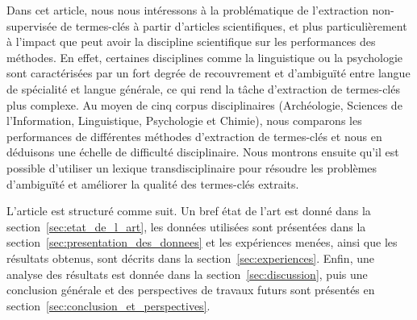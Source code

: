   Dans cet article, nous nous intéressons à la problématique de l'extraction non-supervisée de termes-clés à partir d'articles scientifiques, et plus particulièrement à l'impact que peut avoir la discipline scientifique sur les performances des méthodes.
  En effet, certaines disciplines comme la linguistique ou la psychologie sont caractérisées par un fort degrée de recouvrement et d'ambiguïté entre langue de spécialité et langue générale, ce qui rend la tâche d'extraction de termes-clés plus complexe.
  Au moyen de cinq corpus disciplinaires (Archéologie, Sciences de
  l'Information, Linguistique, Psychologie et Chimie), nous comparons les
  performances de différentes méthodes d'extraction de termes-clés et nous en
  déduisons une échelle de difficulté disciplinaire.
  Nous montrons ensuite qu'il est possible d'utiliser un lexique
  transdisciplinaire pour résoudre les problèmes d'ambiguïté et améliorer la
  qualité des termes-clés extraits.


  L'article est structuré comme suit. Un bref état de l'art est donné dans la
  section~\ref{sec:etat_de_l_art}, les données utilisées sont présentées dans la
  section~\ref{sec:presentation_des_donnees} et les expériences menées, ainsi
  que les résultats obtenus, sont décrits dans la section~\ref{sec:experiences}.
  Enfin, une analyse des résultats est donnée dans la
  section~\ref{sec:discussion}, puis une conclusion générale et des perspectives
  de travaux futurs sont présentés en
  section~\ref{sec:conclusion_et_perspectives}.

